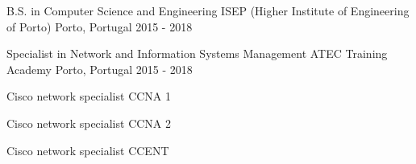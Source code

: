 

\begin{cventries}

  \cventry
    {B.S. in Computer Science and Engineering} %
    {ISEP (Higher Institute of Engineering of Porto)} %
    {Porto, Portugal} %
    {2015 - 2018} %
    {
    }


  \cventry
    {Specialist in Network and Information Systems Management} %
    {ATEC Training Academy} %
    {Porto, Portugal} %
    {2015 - 2018} %
    {
      \begin{cvitems} %
        \item {Cisco network specialist CCNA 1}
        \item {Cisco network specialist CCNA 2}
        \item {Cisco network specialist CCENT}
      \end{cvitems}
    }



\end{cventries}
